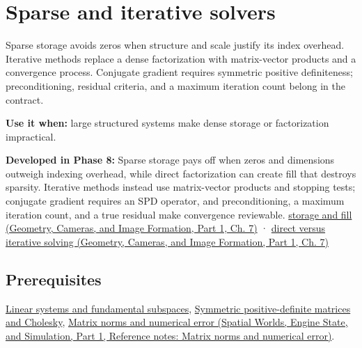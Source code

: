 \hypertarget{appendix-67c87a3d9e94}{}\label{referencestart:appendix-67c87a3d9e94}
\section{Sparse and iterative solvers}\label{appendix-67c87a3d9e94-sparse-and-iterative-solvers}

\hypertarget{appendix-67c87a3d9e94-sparse-and-iterative-solvers}{}

Sparse storage avoids zeros when structure and scale justify its index overhead. Iterative methods replace a dense factorization with matrix-vector products and a convergence process. Conjugate gradient requires symmetric positive definiteness; preconditioning, residual criteria, and a maximum iteration count belong in the contract.

\textbf{Use it when:} large structured systems make dense storage or factorization impractical.

\textbf{Developed in Phase 8:} Sparse storage pays off when zeros and dimensions outweigh indexing overhead, while direct factorization can create fill that destroys sparsity. Iterative methods instead use matrix-vector products and stopping tests; conjugate gradient requires an SPD operator, and preconditioning, a maximum iteration count, and a true residual make convergence reviewable. \href{../03-Geometry-Cameras-and-Image-Formation-P01/main.pdf\#nameddest=02-foundations-ii-ch038-sparse-storage-changes-the-cost-model}{storage and fill (Geometry, Cameras, and Image Formation, Part 1, Ch. 7)} · \href{../03-Geometry-Cameras-and-Image-Formation-P01/main.pdf\#nameddest=02-foundations-ii-ch038-direct-and-iterative-solvers-suit-different-workloads}{direct versus iterative solving (Geometry, Cameras, and Image Formation, Part 1, Ch. 7)}

\subsection{Prerequisites}\label{appendix-67c87a3d9e94-prerequisites}

\hypertarget{appendix-67c87a3d9e94-prerequisites}{}

\hyperref[appendix-8572a4a060c1]{Linear systems and fundamental subspaces}, \hyperref[appendix-50d2ea3c9b26]{Symmetric positive-definite matrices and Cholesky}, \href{../05-Spatial-Worlds-Engine-State-and-Simulation-P01/main.pdf\#nameddest=appendix-f8657bac66e5}{Matrix norms and numerical error (Spatial Worlds, Engine State, and Simulation, Part 1, Reference notes: Matrix norms and numerical error)}.

